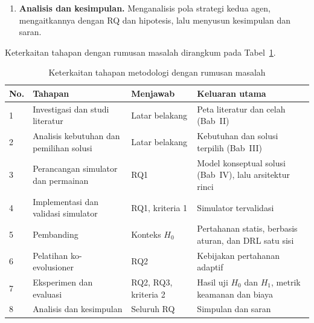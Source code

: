 \begin{enumerate}
	\item \textbf{Analisis dan kesimpulan.} Menganalisis pola strategi kedua agen, mengaitkannya dengan RQ dan hipotesis, lalu menyusun kesimpulan dan saran.
\end{enumerate}

Keterkaitan tahapan dengan rumusan masalah dirangkum pada Tabel~\ref{tab:methodology_rq}.

\begin{table}[htbp]
\centering
\caption{Keterkaitan tahapan metodologi dengan rumusan masalah}
\label{tab:methodology_rq}
\small
\begin{tabular}{|p{0.6cm}|p{4.8cm}|p{2.3cm}|p{5.5cm}|}
\hline
\textbf{No.} & \textbf{Tahapan} & \textbf{Menjawab} & \textbf{Keluaran utama} \\
\hline
1 & Investigasi dan studi literatur & Latar belakang & Peta literatur dan celah (Bab~II) \\
\hline
2 & Analisis kebutuhan dan pemilihan solusi & Latar belakang & Kebutuhan dan solusi terpilih (Bab~III) \\
\hline
3 & Perancangan simulator dan permainan & RQ1 & Model konseptual solusi (Bab~IV), lalu arsitektur rinci \\
\hline
4 & Implementasi dan validasi simulator & RQ1, kriteria 1 & Simulator tervalidasi \\
\hline
5 & Pembanding & Konteks $H_0$ & Pertahanan statis, berbasis aturan, dan DRL satu sisi \\
\hline
6 & Pelatihan ko-evolusioner & RQ2 & Kebijakan pertahanan adaptif \\
\hline
7 & Eksperimen dan evaluasi & RQ2, RQ3, kriteria 2 & Hasil uji $H_0$ dan $H_1$, metrik keamanan dan biaya \\
\hline
8 & Analisis dan kesimpulan & Seluruh RQ & Simpulan dan saran \\
\hline
\end{tabular}
\end{table}

